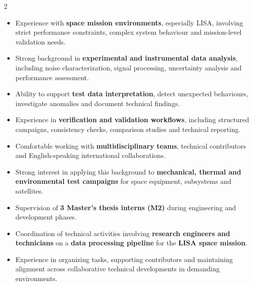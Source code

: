 \documentclass[8pt,a4paper,ragged2e,withhyper]{../_shared/altacv}
\begin{document}
\begin{paracol}{2}

\begin{itemize}
  \item Experience with \textbf{space mission environments}, especially LISA, involving strict performance constraints, complex system behaviour and mission-level validation needs.
  \item Strong background in \textbf{experimental and instrumental data analysis}, including noise characterization, signal processing, uncertainty analysis and performance assessment.
  \item Ability to support \textbf{test data interpretation}, detect unexpected behaviours, investigate anomalies and document technical findings.
  \item Experience in \textbf{verification and validation workflows}, including structured campaigns, consistency checks, comparison studies and technical reporting.
  \item Comfortable working with \textbf{multidisciplinary teams}, technical contributors and English-speaking international collaborations.
  \item Strong interest in applying this background to \textbf{mechanical, thermal and environmental test campaigns} for space equipment, subsystems and satellites.
\end{itemize}


\begin{itemize}
  \item Supervision of \textbf{3 Master's thesis interns (M2)} during engineering and development phases.
  \item Coordination of technical activities involving \textbf{research engineers and technicians} on a \textbf{data processing pipeline} for the \textbf{LISA space mission}.
  \item Experience in organizing tasks, supporting contributors and maintaining alignment across collaborative technical developments in demanding environments.
\end{itemize}


\divider

\divider

\medskip


\divider


\end{paracol}
\end{document}
